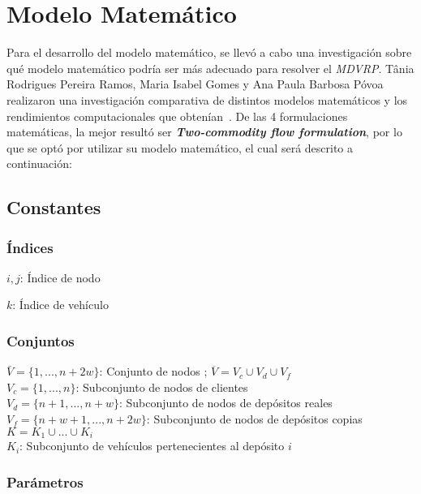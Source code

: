 \documentclass[letter, 10pt]{article}
\begin{document}
\section{Modelo Matemático}

Para el desarrollo del modelo matemático, se llevó a cabo una investigación sobre qué modelo matemático podría ser más adecuado para resolver el \textit{MDVRP}. Tânia Rodrigues Pereira Ramos, Maria Isabel Gomes y Ana Paula Barbosa Póvoa realizaron una investigación comparativa de distintos modelos matemáticos y los rendimientos computacionales que obtenían~\cite{MathematicalModel}. De las 4 formulaciones matemáticas, la mejor resultó ser \textbf{\textit{Two-commodity flow formulation}}, por lo que se optó por utilizar su modelo matemático, el cual será descrito a continuación:

\subsection{Constantes}

\subsubsection{Índices}

$i,j$: Índice de nodo

$k$: Índice de vehículo

\subsubsection{Conjuntos}

$\bar{V} = \{1, ...,n+2w\}$: Conjunto de nodos ; $ \overline{V} = V_{c} \cup V_{d} \cup V_{f}$\\

$V_{c} = \{1, ...,n\}$: Subconjunto de nodos de clientes\\

$V_{d} = \{n+1, ..., n+w\}$: Subconjunto de nodos de depósitos reales\\

$V_{f} = \{n+w+1, ..., n+2w\}$: Subconjunto de nodos de depósitos copias\\

$K = K_{1} \cup ... \cup K_{i}$\\

$K_{i}$: Subconjunto de vehículos pertenecientes al depósito $i$

\subsubsection{Parámetros}
\end{document}
